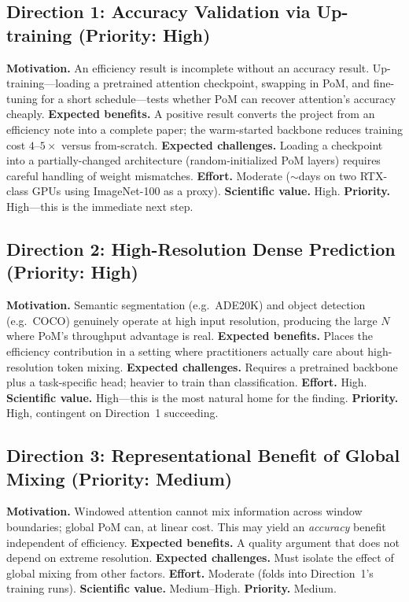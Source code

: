 \documentclass[11pt,a4paper]{article}
\begin{document}
\subsection*{Direction 1: Accuracy Validation via Up-training (Priority: High)}
\textbf{Motivation.} An efficiency result is incomplete without an accuracy result. Up-training---loading a pretrained attention checkpoint, swapping in PoM, and fine-tuning for a short schedule---tests whether PoM can recover attention's accuracy cheaply. \textbf{Expected benefits.} A positive result converts the project from an efficiency note into a complete paper; the warm-started backbone reduces training cost $4$--$5\times$ versus from-scratch. \textbf{Expected challenges.} Loading a checkpoint into a partially-changed architecture (random-initialized PoM layers) requires careful handling of weight mismatches. \textbf{Effort.} Moderate ($\sim$days on two RTX-class GPUs using ImageNet-100 as a proxy). \textbf{Scientific value.} High. \textbf{Priority.} High---this is the immediate next step.

\subsection*{Direction 2: High-Resolution Dense Prediction (Priority: High)}
\textbf{Motivation.} Semantic segmentation (e.g.\ ADE20K) and object detection (e.g.\ COCO) genuinely operate at high input resolution, producing the large $N$ where PoM's throughput advantage is real. \textbf{Expected benefits.} Places the efficiency contribution in a setting where practitioners actually care about high-resolution token mixing. \textbf{Expected challenges.} Requires a pretrained backbone plus a task-specific head; heavier to train than classification. \textbf{Effort.} High. \textbf{Scientific value.} High---this is the most natural home for the finding. \textbf{Priority.} High, contingent on Direction~1 succeeding.

\subsection*{Direction 3: Representational Benefit of Global Mixing (Priority: Medium)}
\textbf{Motivation.} Windowed attention cannot mix information across window boundaries; global PoM can, at linear cost. This may yield an \emph{accuracy} benefit independent of efficiency. \textbf{Expected benefits.} A quality argument that does not depend on extreme resolution. \textbf{Expected challenges.} Must isolate the effect of global mixing from other factors. \textbf{Effort.} Moderate (folds into Direction~1's training runs). \textbf{Scientific value.} Medium--High. \textbf{Priority.} Medium.
\end{document}
